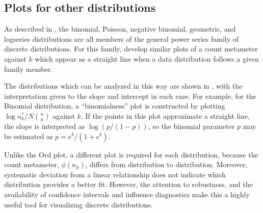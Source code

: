 \documentclass[10pt,krantz2]{krantz}\usepackage[]{graphicx}\usepackage[]{color}
\begin{document}

\subsection{Plots for other distributions}\label{sec:discrete-other}
As described in , the binomial, Poisson, negative binomial,
geometric, and logseries distributions are all members of the
general  power series family of discrete distributions.
For this family, \citet{HoaglinTukey:85} develop similar plots
of a count metameter against $k$ which appear as a straight line
when a data distribution follows a given family member.

The distributions which can be analyzed in this way are shown in
, with the interpretation given to the
slope and intercept in each case.
For example, for the Binomial distribution, a ``binomialness''
plot is constructed by plotting $\log n_k^{*} / N \binom{n}{k}$
against $k$.  If the points in this plot approximate a straight
line, the slope is interpreted as $\log (p/(1-p))$, so the
binomial parameter $p$ may be estimated as $p = e^b/(1+e^b)$.


Unlike the Ord plot, a different plot is required for each distribution,
because the count metameter, \(\phi ( n_k )\), differs
from distribution to distribution.
Moreover, systematic deviation from a linear relationship does not
       indicate which distribution provides a better fit.
However, the attention to robustness, and the availability of confidence
intervals and influence diagnostics make this a highly useful tool
for visualizing discrete distributions.
\end{document}
